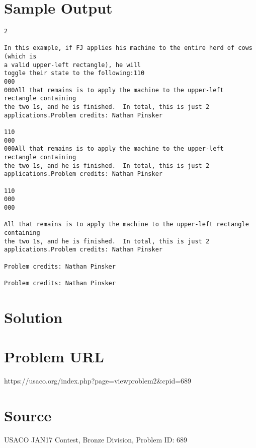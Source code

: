 \documentclass[12pt]{article}
\begin{document}
\section*{Sample Output}
\begin{verbatim}
2

In this example, if FJ applies his machine to the entire herd of cows (which is
a valid upper-left rectangle), he will
toggle their state to the following:110
000
000All that remains is to apply the machine to the upper-left rectangle containing
the two 1s, and he is finished.  In total, this is just 2 applications.Problem credits: Nathan Pinsker

110
000
000All that remains is to apply the machine to the upper-left rectangle containing
the two 1s, and he is finished.  In total, this is just 2 applications.Problem credits: Nathan Pinsker

110
000
000

All that remains is to apply the machine to the upper-left rectangle containing
the two 1s, and he is finished.  In total, this is just 2 applications.Problem credits: Nathan Pinsker

Problem credits: Nathan Pinsker

Problem credits: Nathan Pinsker
\end{verbatim}

\section*{Solution}


\section*{Problem URL}
https://usaco.org/index.php?page=viewproblem2&cpid=689

\section*{Source}
USACO JAN17 Contest, Bronze Division, Problem ID: 689
\end{document}
